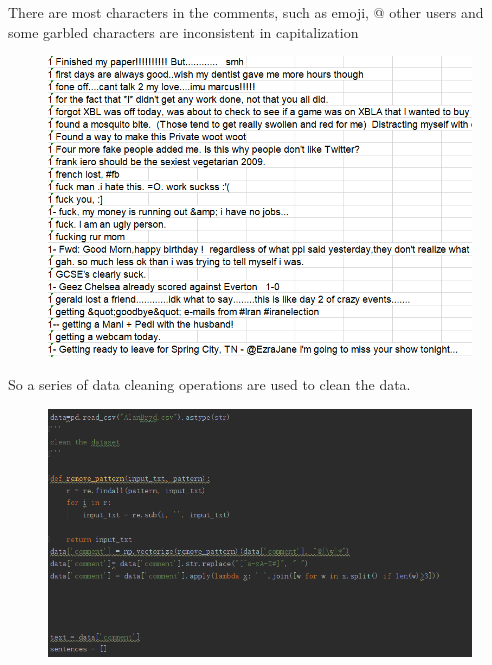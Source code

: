 \documentclass{article}
\begin{document}
There are most characters in the comments, such as emoji, @ other users and some garbled characters are inconsistent in capitalization
 \begin{figure}[H]
\centering
  \includegraphics[width=.8\textwidth]{3-2.png} %
  \end{figure}
So a series of data cleaning operations are used to clean the data.
 \begin{figure}[H]
\centering
  \includegraphics[width=.8\textwidth]{3-3.png} %
  \end{figure}
\end{document}
